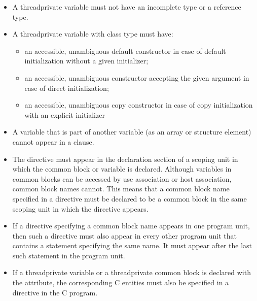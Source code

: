 {{{{\begin{itemize}
\item A threadprivate variable must not have an incomplete type or a reference type.

\item A threadprivate variable with class type must have:

\begin{itemize} %
\item an accessible, unambiguous default constructor in case of default initialization 
without a given initializer;

\item an accessible, unambiguous constructor accepting the given argument in case of 
direct initialization;

\item an accessible, unambiguous copy constructor in case of copy initialization with an 
explicit initializer
\end{itemize} %
\cppspecificend

\end{itemize} %

\fortranspecificstart
\begin{itemize} %
\item A variable that is part of another variable (as an array or structure element) cannot 
appear in a  clause.

\item The  directive must appear in the declaration section of a scoping 
unit in which the common block or variable is declared. Although variables in 
common blocks can be accessed by use association or host association, common 
block names cannot. This means that a common block name specified in a 
 directive must be declared to be a common block in the same 
scoping unit in which the  directive appears. 

\item If a  directive specifying a common block name appears in one 
program unit, then such a directive must also appear in every other program unit that 
contains a  statement specifying the same name. It must appear after the last 
such  statement in the program unit.

\item If a threadprivate variable or a threadprivate common block is declared 
with the  attribute, the corresponding C entities must also be specified in a 
 directive in the C program.


\end{itemize}}}}}
